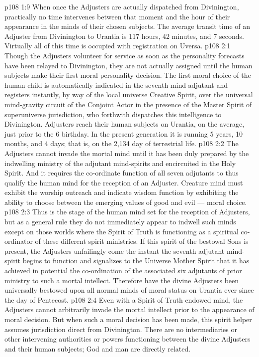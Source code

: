 \vs p108 1:9 When once the Adjusters are actually dispatched from Divinington, practically no time intervenes between that moment and the hour of their appearance in the minds of their chosen subjects. The average transit time of an Adjuster from Divinington to Urantia is 117 hours, 42 minutes, and 7 seconds. Virtually all of this time is occupied with registration on Uversa.
\vs p108 2:1 Though the Adjusters volunteer for service as soon as the personality forecasts have been relayed to Divinington, they are not actually assigned until the human subjects make their first moral personality decision. The first moral choice of the human child is automatically indicated in the seventh mind\hyp{}adjutant and registers instantly, by way of the local universe Creative Spirit, over the universal mind\hyp{}gravity circuit of the Conjoint Actor in the presence of the Master Spirit of superuniverse jurisdiction, who forthwith dispatches this intelligence to Divinington. Adjusters reach their human subjects on Urantia, on the average, just prior to the 6 birthday. In the present generation it is running 5 years, 10 months, and 4 days; that is, on the 2,134 day of terrestrial life.
\vs p108 2:2 \pc The Adjusters cannot invade the mortal mind until it has been duly prepared by the indwelling ministry of the adjutant mind\hyp{}spirits and encircuited in the Holy Spirit. And it requires the co\hyp{}ordinate function of all seven adjutants to thus qualify the human mind for the reception of an Adjuster. Creature mind must exhibit the worship outreach and indicate wisdom function by exhibiting the ability to choose between the emerging values of good and evil --- moral choice.
\vs p108 2:3 Thus is the stage of the human mind set for the reception of Adjusters, but as a general rule they do not immediately appear to indwell such minds except on those worlds where the Spirit of Truth is functioning as a spiritual co\hyp{}ordinator of these different spirit ministries. If this spirit of the bestowal Sons is present, the Adjusters unfailingly come the instant the seventh adjutant mind\hyp{}spirit begins to function and signalizes to the Universe Mother Spirit that it has achieved in potential the co\hyp{}ordination of the associated six adjutants of prior ministry to such a mortal intellect. Therefore have the divine Adjusters been universally bestowed upon all normal minds of moral status on Urantia ever since the day of Pentecost.
\vs p108 2:4 Even with a Spirit of Truth endowed mind, the Adjusters cannot arbitrarily invade the mortal intellect prior to the appearance of moral decision. But when such a moral decision has been made, this spirit helper assumes jurisdiction direct from Divinington. There are no intermediaries or other intervening authorities or powers functioning between the divine Adjusters and their human subjects; God and man are directly related.
